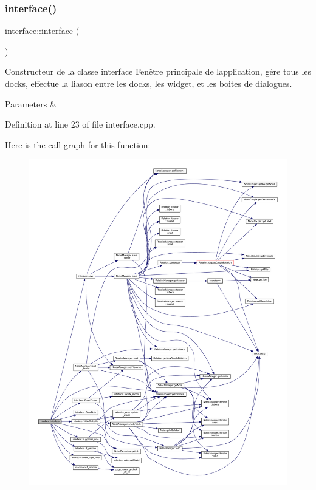 \subsubsection{\texorpdfstring{interface()}{interface()}}
{\footnotesize\ttfamily interface\+::interface (\begin{DoxyParamCaption}{ }\end{DoxyParamCaption})}



Constructeur de la classe interface Fenêtre principale de l\textquotesingle{}application, gére tous les docks, effectue la liason entre les docks, les widget, et les boites de dialogues. 


\begin{DoxyParams}{Parameters}
{\em } & \\
\hline
\end{DoxyParams}


Definition at line 23 of file interface.\+cpp.

Here is the call graph for this function\+:\nopagebreak
\begin{figure}[H]
\begin{center}
\leavevmode
\includegraphics[width=350pt]{classinterface_a13e0ee4b9df1714d747d62ec46220c55_cgraph}
\end{center}
\end{figure}
\mbox{\label{classinterface_a8511f28c5bc5d3c24a24e9aaef4db502}} 
